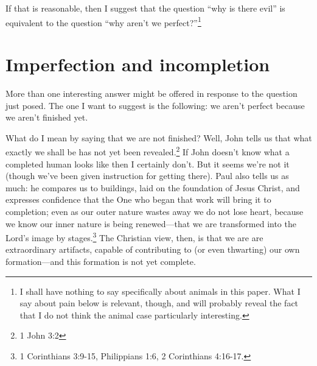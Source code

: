 \documentclass[11pt]{amsart}
\begin{document}
If that is reasonable, then I suggest that the question ``why is there evil'' is equivalent to the question ``why aren't we perfect?''\footnote{I shall have nothing to say specifically about animals in this paper. What I say about pain below is relevant, though, and will probably reveal the fact that I do not think the animal case particularly interesting.}

\section{Imperfection and incompletion}




More than one interesting answer might be offered in response to the question just posed. The one I want to suggest is the following: we aren't perfect because we aren't finished yet.

What do I mean by saying that we are not finished? Well, John tells us that what exactly we shall be has not yet been revealed.\footnote{1 John 3:2} If John doesn't know what a completed human looks like then I certainly don't. But it seems we're not it (though we've been given instruction for getting there). Paul also tells us as much: he compares us to buildings, laid on the foundation of Jesus Christ, and expresses confidence that the One who began that work will bring it to completion; even as our outer nature wastes away we do not lose heart, because we know our inner nature is being renewed---that we are transformed into the Lord's image by stages.\footnote{1 Corinthians 3:9-15, Philippians 1:6, 2 Corinthians 4:16-17.} The Christian view, then, is that we are are extraordinary artifacts, capable of contributing to (or even thwarting) our own formation---and this formation is not yet complete.%
\end{document}
